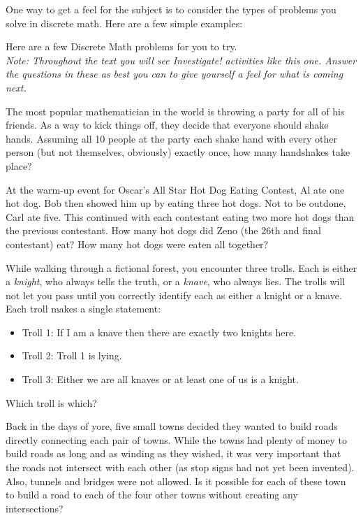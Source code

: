 \documentclass[12pt]{article}
\begin{document}
One way to get a feel for the subject is to consider the types of problems you solve in discrete math.  Here are a few simple examples:


\begin{activity}
Here are a few Discrete Math problems for you to try.  \\ \textit{Note: Throughout the text you will see \emph{Investigate!} activities like this one.  Answer the questions in these as best you can to give yourself a feel for what is coming next.}
\begin{questions}
\question The most popular mathematician in the world is throwing a party for all of his friends.  As a way to kick things off, they decide that everyone should shake hands.  Assuming all 10 people at the party each shake hand with every other person (but not themselves, obviously) exactly once, how many handshakes take place?

\question At the warm-up event for Oscar's All Star Hot Dog Eating Contest, Al ate one hot dog.  Bob then showed him up by eating three hot dogs.  Not to be outdone, Carl ate five.  This continued with each contestant eating two more hot dogs than the previous contestant. How many hot dogs did Zeno (the 26th and final contestant) eat? How many hot dogs were eaten all together?

\question While walking through a fictional forest, you encounter three trolls.  Each is either a {\em knight}, who always tells the truth, or a {\em knave}, who always lies.  The trolls will not let you pass until you correctly identify each as either a knight or a knave.  Each troll makes a single statement:
  \begin{itemize}
   \item[] Troll 1: If I am a knave then there are exactly two knights here. 
   \item[] Troll 2: Troll 1 is lying.
   \item[] Troll 3: Either we are all knaves or at least one of us is a knight.
  \end{itemize}
Which troll is which? 

\question Back in the days of yore, five small towns decided they wanted to build roads directly connecting each pair of towns. While the towns had plenty of money to build roads as long and as winding as they wished, it was very important that the roads not intersect with each other (as stop signs had not yet been invented). Also, tunnels and bridges were not allowed. Is it possible for each of these town to build a road to each of the four other towns without creating any intersections? 
\end{questions}
\end{activity}
\end{document}
